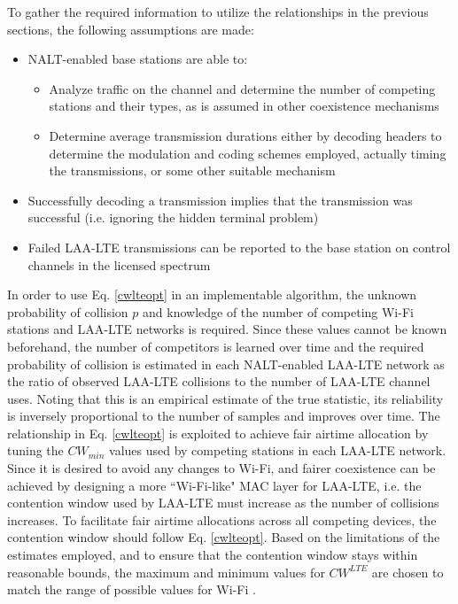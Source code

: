 To gather the required information to utilize the relationships in the previous sections, the following assumptions are made:
\begin{itemize}
	\item NALT-enabled base stations are able to:
	\begin{itemize}
	\item Analyze traffic on the channel and determine the number of competing stations and their types, as is assumed in other coexistence mechanisms
	\item Determine average transmission durations either by decoding headers to determine the modulation and coding schemes employed, actually timing the transmissions, or some other suitable mechanism
	\end{itemize} 
	\item Successfully decoding a transmission implies that the transmission was successful (i.e. ignoring the hidden terminal problem) 
	\item Failed \mbox{LAA-LTE} transmissions can be reported to the base station on control channels in the licensed spectrum
\end{itemize}

In order to use Eq. \ref{cwlteopt} in an implementable algorithm, the unknown probability of collision  $p$ and knowledge of the number of competing Wi-Fi stations and LAA-LTE networks is required. Since these values cannot be known beforehand, the number of competitors is learned over time and the required probability of collision is estimated in each NALT-enabled LAA-LTE network as the ratio of observed \mbox{LAA-LTE} collisions to the number of \mbox{LAA-LTE} channel uses.  Noting that this is an empirical estimate of the true statistic, its reliability is inversely proportional to the number of samples and improves over time. The relationship in Eq. \ref{cwlteopt} is exploited to achieve fair airtime allocation by tuning the $CW_{min}$ values used by competing stations in each LAA-LTE network.  Since it is desired to avoid any changes to \mbox{Wi-Fi}, and fairer coexistence can be achieved by designing a more \mbox{``\mbox{Wi-Fi}-like"} MAC layer for \mbox{LAA-LTE}, i.e. the contention window used by \mbox{LAA-LTE} must increase as the number of collisions increases.  To facilitate fair airtime allocations across all competing devices, the contention window should follow Eq. \ref{cwlteopt}.  Based on the limitations of the estimates employed, and to ensure that the contention window stays within reasonable bounds, the maximum and minimum values for $CW^{LTE}$ are chosen to match the range of possible values for \mbox{Wi-Fi} \cite{80211}.  

